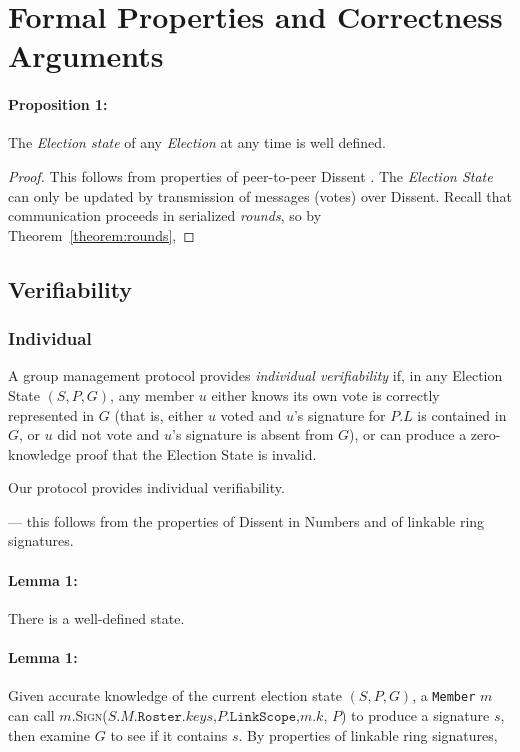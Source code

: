 \section{Formal Properties and Correctness Arguments}
\paragraph{Proposition 1:}
\begin{theorem}The \emph{Election state} of any \emph{Election} at
any time is well defined. \end{theorem}
\begin{proof}This follows from properties of peer-to-peer Dissent \cite{sec}.
  The \emph{Election State} can only be updated by transmission of messages
  (votes) over Dissent. Recall that communication proceeds in serialized
  \emph{rounds}, so by Theorem~\ref{theorem:rounds},
\end{proof}

  \subsection{Verifiability}
    \subsubsection{Individual}
    A group management protocol provides \emph{individual verifiability} if, in
    any Election State $(S, P, G)$, any member $u$
    either knows its own vote is correctly represented in $G$ (that is, either
    $u$ voted and $u$'s
    signature for $P.L$ is contained in $G$,
    or $u$ did not vote and $u$'s signature is absent from $G$), or can produce
    a zero-knowledge proof that the Election State is invalid.

    Our protocol provides individual verifiability.

    --- this follows from the
    properties of Dissent in Numbers and of linkable ring signatures.%
    \paragraph{Lemma 1:} There is a well-defined state.

    \paragraph{Lemma 1:} Given accurate knowledge of the current election state
    $(S, P, G)$, a \texttt{Member} $m$ can call
    $m$.\textsc{Sign}($S.M.\texttt{Roster}.keys$,$P.\texttt{LinkScope}$,$m$.$k$,
    $P$) to produce a signature $s$, then examine $G$ to see if it contains $s$.
    By properties of linkable ring signatures,


